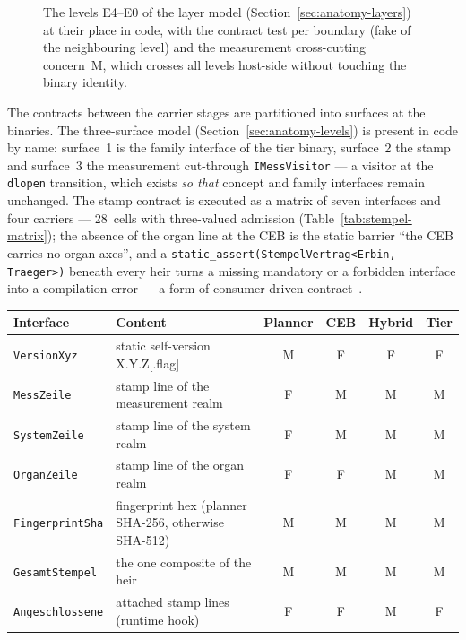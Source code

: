 \begin{nurkurz}
\begin{figure}[htbp]
\begin{tikzpicture}
\end{tikzpicture}
\caption[The levels E4--E0 in code]{The levels E4--E0 of the layer model (Section~\ref{sec:anatomy-layers}) at their place in code,
with the contract test per boundary (fake of the neighbouring level) and the measurement cross-cutting
concern~M, which crosses all levels host-side without touching the binary identity.}\label{fig:impl-layers}
\end{figure}

The contracts between the carrier stages are partitioned into surfaces at the binaries. The
three-surface model (Section~\ref{sec:anatomy-levels}) is present in code by name: surface~1 is the
family interface of the tier binary, surface~2 the stamp and surface~3 the measurement cut-through
\texttt{IMessVisitor} --- a visitor at the \texttt{dlopen} transition, which exists \emph{so that}
concept and family interfaces remain unchanged. The stamp contract is executed as a matrix of seven
interfaces and four carriers --- 28~cells with three-valued admission (Table~\ref{tab:stempel-matrix});
the absence of the organ line at the CEB is the static barrier \enquote{the CEB carries no organ
axes}, and a \texttt{static\_assert(StempelVertrag<Erbin, Traeger>)} beneath every heir turns a
missing mandatory or a forbidden interface into a compilation error --- a form of consumer-driven
contract~\cite{robinson2006cdc}.
\begin{table}[htbp]\centering\footnotesize
\begin{tabular}{@{}llcccc@{}}
\toprule
Interface & Content & Planner & CEB & Hybrid & Tier \\
\midrule
\texttt{VersionXyz}     & static self-version X.Y.Z[.flag]                  & M & F & F & F \\
\texttt{MessZeile}      & stamp line of the measurement realm               & F & M & M & M \\
\texttt{SystemZeile}    & stamp line of the system realm                    & F & M & M & M \\
\texttt{OrganZeile}     & stamp line of the organ realm                     & F & F & M & M \\
\texttt{FingerprintSha} & fingerprint hex (planner SHA-256, otherwise SHA-512) & M & M & M & M \\
\texttt{GesamtStempel}  & the one composite of the heir                     & M & M & M & M \\
\texttt{Angeschlossene} & attached stamp lines (runtime hook)               & F & F & M & F \\

\end{tabular}
\end{table}
\end{nurkurz}
